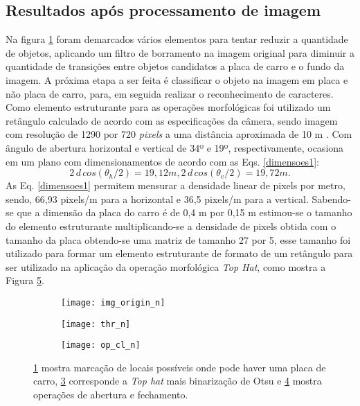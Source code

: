 \subsection{Resultados após processamento de imagem}


Na figura \ref{fig1:demarcada} foram demarcados vários elementos para tentar reduzir a quantidade de objetos, aplicando um filtro de borramento na imagem original para diminuir a quantidade de transições entre objetos candidatos a placa de carro e o fundo da imagem. A próxima etapa a ser feita é classificar o objeto na imagem em placa e não placa de carro, para, em seguida realizar o reconhecimento de caracteres.
Como elemento estruturante para as operações morfológicas foi utilizado um retângulo calculado de acordo com as especificações da câmera, sendo imagem com resolução de 1290 por 720 \emph{pixels} a uma distância aproximada de 10 m . Com ângulo de abertura horizontal e vertical de 34º e 19º, respectivamente, ocasiona em um plano com dimensionamentos de acordo com as Eqs. \ref{dimensoes1}:
\begin{equation}
    2\,d\,cos(\theta_{h} /2) = 19,12 m, 
    2\,d\,cos(\theta_{v} /2) = 19,72 m.
    \label{dimensoes1}
\end{equation}
As Eq. \ref{dimensoes1} permitem mensurar a densidade linear de pixels por metro, sendo, 66,93 pixels/m para a horizontal e 36,5 pixels/m para a vertical.
Sabendo-se que a dimensão da placa do carro é de 0,4 m por 0,15 m estimou-se o tamanho do elemento estruturante multiplicando-se a densidade de pixels obtida com o tamanho da placa obtendo-se uma matriz de tamanho 27 por 5, esse tamanho foi utilizado para formar um elemento estruturante de formato de um retângulo para ser utilizado na aplicação da operação morfológica \emph{Top Hat}, como mostra a Figura \ref{fig:three graphs}.

\begin{figure}[H]
     \centering
     
     \begin{subfigure}{0.7\textwidth}
         \texttt{[image: img\_origin\_n]}
         \caption{}
         \label{fig1:demarcada}
     \end{subfigure}

     \begin{subfigure}{0.7\textwidth}
         \texttt{[image: thr\_n]}
          \caption{}
         \label{fig2:thresh}
     \end{subfigure}

  
\end{figure}

\begin{figure}[H] \ContinuedFloat
    \centering
    \begin{subfigure}{0.7\textwidth}
         \texttt{[image: op\_cl\_n]}
          \caption{}
         \label{fig3:op_cl}
         
     \end{subfigure}
     \caption{\ref{fig1:demarcada} mostra marcação de locais possíveis onde pode haver uma placa de carro, \ref{fig2:thresh} corresponde a \emph{Top hat} mais binarização de Otsu e \ref{fig3:op_cl} mostra operações de abertura e fechamento.}
    \label{fig:three graphs}
\end{figure}
